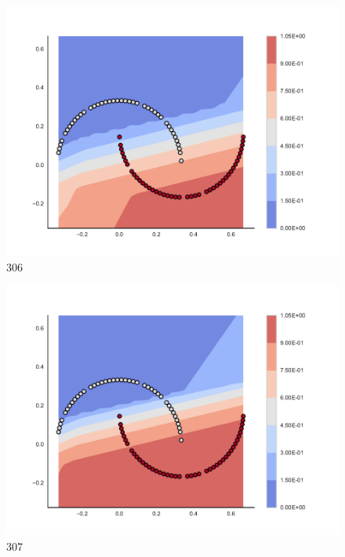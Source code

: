 \begin{subfigure}[b]{0.09\textwidth}
    \includegraphics[clip, trim=2.35cm 1.75cm 4.5cm 0cm,width=\textwidth]{img/convergence/306.pdf}
    \caption{306}
    \label{fig:convergence_306}
\end{subfigure}
%
\begin{subfigure}[b]{0.09\textwidth}
    \includegraphics[clip, trim=2.35cm 1.75cm 4.5cm 0cm,width=\textwidth]{img/convergence/307.pdf}
    \caption{307}
    \label{fig:convergence_307}
\end{subfigure}
%
